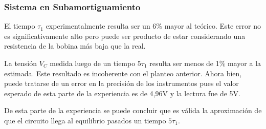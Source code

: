 \subsubsection{Sistema en Subamortiguamiento}
El tiempo $\tau_1$ experimentalmente resulta ser un 6\% mayor al teórico. Este error no es significativamente alto pero puede ser producto de estar considerando una resistencia de la bobina más baja que la real. 

La tensión $V_C$ medida luego de un tiempo $5\tau_1$ resulta ser menos de 1\% mayor a la estimada. Este resultado es incoherente con el planteo anterior. Ahora bien, puede tratarse de un error en la precisión de los instrumentos pues el valor esperado de esta parte de la experiencia es de 4,96V y la lectura fue de 5V. 

De esta parte de la experiencia se puede concluir que es válida la aproximación de que el circuito llega al equilibrio pasados un tiempo $5\tau_1$.

\newpage
